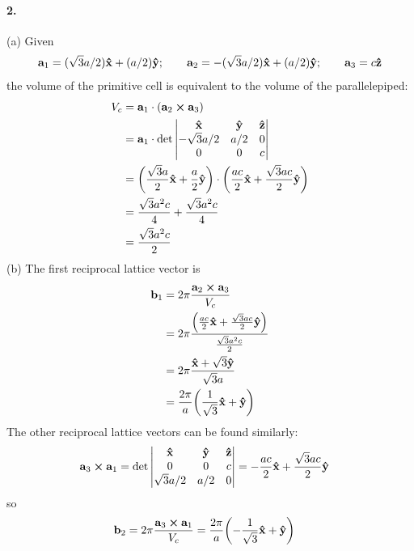 \documentclass[../main.tex]{subfiles}
\begin{document}
\paragraph*{2.} (a) Given
\begin{align*}
    \vb{a}_1 = (\sqrt{3}a/2) \vu{x} + (a/2) \vu{y}; \qquad 
    \vb{a}_2 = -(\sqrt{3}a/2) \vu{x} + (a/2) \vu{y}; \qquad
    \vb{a}_3 = c \vu{z}
\end{align*}
the volume of the primitive cell is equivalent to the volume of the parallelepiped:
\begin{align*}
    V_c &= \vb{a}_1 \cdot (\vb{a}_2 \cross \vb{a}_3) \\
    &= \vb{a}_1 \cdot \det\begin{vmatrix}
        \vu{x} & \vu{y} & \vu{z} \\
        -\sqrt{3}a/2 & a/2 & 0 \\
        0 & 0 & c
    \end{vmatrix} \\
    &= \qt(\frac{\sqrt{3}a}{2} \vu x + \frac{a}{2} \vu{y}) \cdot 
    \qt(\frac{ac}{2} \vu{x} + \frac{\sqrt{3}ac}{2} \vu{y}) \\
    &= \frac{\sqrt{3}a^2c}{4} + \frac{\sqrt{3}a^2c}{4} \\
    &= \frac{\sqrt{3}a^2c}{2}
\end{align*}
(b) The first reciprocal lattice vector is
\begin{align*}
    \vb{b}_1 &= 2\pi \frac{\vb{a}_2 \cross \vb{a}_3}{V_c} \\
    &= 2\pi \frac{\qt(\frac{ac}{2} \vu{x} + \frac{\sqrt{3} ac}{2} \vu{y})}{\frac{\sqrt{3}a^2c}{2}} \\
    &= 2\pi \frac{\vu{x} +  \sqrt{3} \vu{y}}{\sqrt{3}a} \\
    &= \frac{2\pi}{a} \qt(\frac{1}{\sqrt{3}} \vu{x} + \vu{y})
\end{align*}
The other reciprocal lattice vectors can be found similarly:
\begin{align*}
    \vb{a}_3 \cross \vb{a}_1 &= \det\begin{vmatrix}
        \vu{x} & \vu{y} & \vu{z} \\
        0 & 0 & c \\
        \sqrt{3}a/2 & a/2 & 0
    \end{vmatrix} = -\frac{ac}{2} \vu{x} + \frac{\sqrt{3}ac}{2} \vu{y}
\end{align*}
so
\begin{align*}
    \vb{b}_2 &= 2\pi \frac{\vb{a}_3 \cross \vb{a}_1}{V_c}
    = \frac{2\pi}{a} \qt(-\frac{1}{\sqrt{3}} \vu{x} + \vu{y})
\end{align*}
\end{document}
